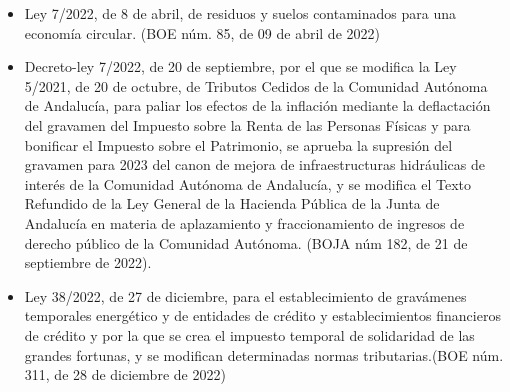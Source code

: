 \documentclass[
]{article}
\begin{document}
\begin{itemize}
\item
  Ley 7/2022, de 8 de abril, de residuos y suelos contaminados para una
  economía circular. (BOE núm. 85, de 09 de abril de 2022)
\item
  Decreto-ley 7/2022, de 20 de septiembre, por el que se modifica la Ley
  5/2021, de 20 de octubre, de Tributos Cedidos de la Comunidad Autónoma
  de Andalucía, para paliar los efectos de la inflación mediante la
  deflactación del gravamen del Impuesto sobre la Renta de las Personas
  Físicas y para bonificar el Impuesto sobre el Patrimonio, se aprueba
  la supresión del gravamen para 2023 del canon de mejora de
  infraestructuras hidráulicas de interés de la Comunidad Autónoma de
  Andalucía, y se modifica el Texto Refundido de la Ley General de la
  Hacienda Pública de la Junta de Andalucía en materia de aplazamiento y
  fraccionamiento de ingresos de derecho público de la Comunidad
  Autónoma. (BOJA núm 182, de 21 de septiembre de 2022).
\item
  Ley 38/2022, de 27 de diciembre, para el establecimiento de gravámenes
  temporales energético y de entidades de crédito y establecimientos
  financieros de crédito y por la que se crea el impuesto temporal de
  solidaridad de las grandes fortunas, y se modifican determinadas
  normas tributarias.(BOE núm. 311, de 28 de diciembre de 2022)
\end{itemize}
\end{document}
